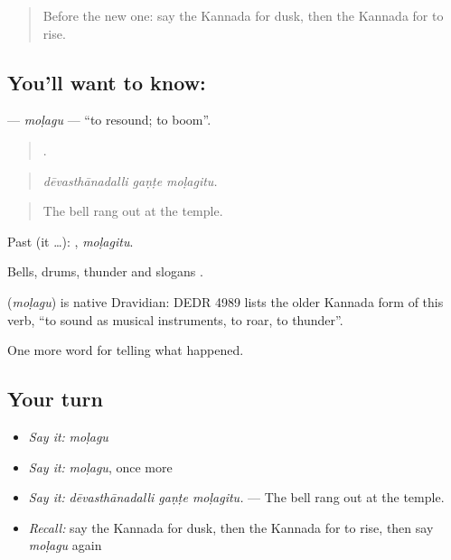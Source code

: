\label{lesson:KA-C363-molagu}



\begin{quote}
Before the new one: say the Kannada for dusk, then the Kannada for to rise.
\end{quote}

\subsection*{You'll want to know: }
\textbf{} — \emph{moḷagu} — \textquotedblleft{}to resound; to boom\textquotedblright{}.

\begin{quote}
  .
\end{quote}

\begin{quote}
\emph{dēvasthānadalli gaṇṭe moḷagitu.}
\end{quote}

\begin{quote}
The bell rang out at the temple.
\end{quote}

Past (it …): , \emph{moḷagitu}.

Bells, drums, thunder and slogans .

\begin{cousinweb}
\textbf{} (\emph{moḷagu}) is native Dravidian: DEDR 4989 lists the older Kannada form of this verb, \textquotedblleft{}to sound as musical instruments, to roar, to thunder\textquotedblright{}.
\end{cousinweb}

\begin{grammarlens}[title={What you've built}]
One more word for telling what happened.
\end{grammarlens}

\subsection*{Your turn}
\begin{itemize}
\raggedright
  \item \emph{Say it:} \emph{moḷagu}
  \item \emph{Say it:} \emph{moḷagu}, once more
  \item \emph{Say it:} \emph{dēvasthānadalli gaṇṭe moḷagitu.} — The bell rang out at the temple.
  \item \emph{Recall:} say the Kannada for dusk, then the Kannada for to rise, then say \emph{moḷagu} again
\end{itemize}

